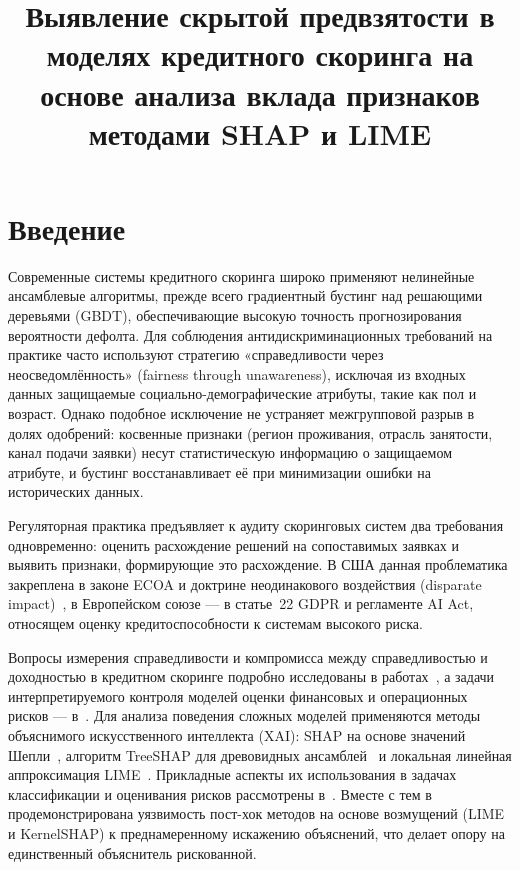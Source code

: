 \documentclass{misisarticle}
\title{Выявление скрытой предвзятости в моделях кредитного скоринга на основе анализа вклада признаков методами SHAP и LIME}
\begin{document}
\maketitle

\section{Введение}

Современные системы кредитного скоринга широко применяют нелинейные ансамблевые алгоритмы, прежде всего градиентный бустинг над решающими деревьями (GBDT), обеспечивающие высокую точность прогнозирования вероятности дефолта. Для соблюдения антидискриминационных требований на практике часто используют стратегию «справедливости через неосведомлённость» (fairness through unawareness), исключая из входных данных защищаемые социально-демографические атрибуты, такие как пол и возраст. Однако подобное исключение не устраняет межгрупповой разрыв в долях одобрений: косвенные признаки (регион проживания, отрасль занятости, канал подачи заявки) несут статистическую информацию о защищаемом атрибуте, и бустинг восстанавливает её при минимизации ошибки на исторических данных.

Регуляторная практика предъявляет к аудиту скоринговых систем два требования одновременно: оценить расхождение решений на сопоставимых заявках и выявить признаки, формирующие это расхождение. В США данная проблематика закреплена в законе ECOA и доктрине неодинакового воздействия (disparate impact)~\cite{barocas2016}, в Европейском союзе — в статье~22 GDPR и регламенте AI Act, относящем оценку кредитоспособности к системам высокого риска.

Вопросы измерения справедливости и компромисса между справедливостью и доходностью в кредитном скоринге подробно исследованы в работах~\cite{kozodoi2022, chen2024}, а задачи интерпретируемого контроля моделей оценки финансовых и операционных рисков — в~\cite{mishurov2023}. Для анализа поведения сложных моделей применяются методы объяснимого искусственного интеллекта (XAI): SHAP на основе значений Шепли~\cite{lundberg2017}, алгоритм TreeSHAP для древовидных ансамблей~\cite{lundberg2020} и локальная линейная аппроксимация LIME~\cite{ribeiro2016}. Прикладные аспекты их использования в задачах классификации и оценивания рисков рассмотрены в~\cite{demin2026, abramov2026}. Вместе с тем в~\cite{slack2020} продемонстрирована уязвимость пост-хок методов на основе возмущений (LIME и KernelSHAP) к преднамеренному искажению объяснений, что делает опору на единственный объяснитель рискованной.
\end{document}
